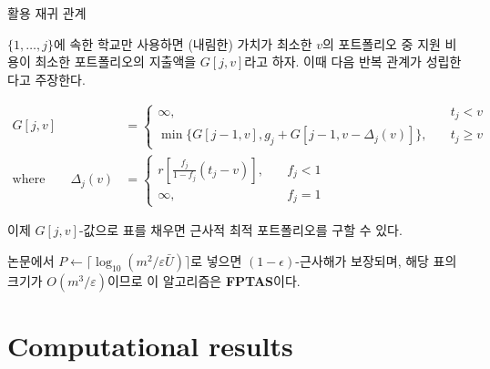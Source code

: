 \documentclass[10pt,slidestop,compress,mathserif,notheorems]{beamer}
\newif\ifen
\theoremstyle{definition}
\theoremstyle{definition}
\begin{document}
\begin{frame}{\ifen Recursion relation for valuation DP\else 활용 재귀 관계\fi}
\ifen 
Let $G[j, v]$ denote the application cost of the least expensive portfolio that uses only schools $\{ 1, \dots, j\}$ and has (rounded) valuation at least $v$. We argue that
\else
$\{ 1, \dots, j\}$에 속한 학교만 사용하면 (내림한) 가치가 최소한 $v$의 포트폴리오 중 지원 비용이 최소한 포트폴리오의 지출액을 $G[j, v]$라고 하자. 이때 다음 반복 관계가 성립한다고 주장한다.
\fi
\begin{align*}
G[j, v] &=
\begin{cases}
\infty, \quad & t_j < v \\
\min\bigl\{G[j-1, v], g_j + G[j-1, v - \Delta_j(v)] \bigr\}, \quad & t_j \geq v 
\end{cases}\\
\text{where}\qquad
\Delta_j (v) &= 
\begin{cases}
r\left[\frac{f_j}{1 - f_j} (t_j - v)\right], \quad & f_j < 1\\
\infty, &f_j = 1\ifen.\fi
\end{cases} \label{deltajvdef}
\end{align*}

\ifen
Now we can fill a lookup table with the entries of $G[j, v]$ and compute an approximately optimal portfolio. 

In the paper, we show that setting $P \gets \bigl\lceil\log_{10}\left(m^2 / \varepsilon \bar U\right)\bigr\rceil$ guarantees a $(1- \epsilon)$-optimal portfolio, and that this yields a table of size $O(m^3 / \varepsilon)$, meaning that this algorithm is \textbf{an FPTAS}.
\else
이제 $G[j, v]$-값으로 표를 채우면 근사적 최적 포트폴리오를 구할 수 있다.

논문에서 $P \gets \bigl\lceil\log_{10}\left(m^2 / \varepsilon \bar U\right)\bigr\rceil$로 넣으면 $(1- \epsilon)$-근사해가 보장되며, 해당 표의 크기가  $O(m^3 / \varepsilon)$이므로 이 알고리즘은 \textbf{FPTAS}이다.
\fi
\end{frame}

\ifen
\section{Computational results}
\else
\end{document}

